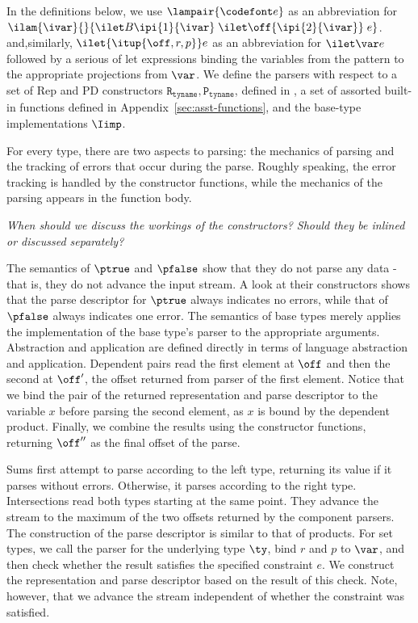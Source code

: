 In the definitions below, we use $\lampair{\codefont e}$ as an
abbreviation for $\ilam{\ivar}{}{
  \ilet B {\ipi{1}{\ivar}}\;
  \ilet \off {\ipi{2}{\ivar}}\; e}$.
and,similarly, $\ilet {\itup{\off,r,p}} e$ as an abbreviation for
$\ilet \var e$ followed by a serious of let expressions binding the
variables from the pattern to the appropriate projections from $\var$.
We define the parsers with respect to a set of Rep and PD constructors
$\mathtt{R_{tyname}, P_{tyname}}$, defined in ,
a set of assorted built-in functions defined in
Appendix~\ref{sec:asst-functions}, and the base-type implementations
$\Iimp$.

For every type, there are two aspects to parsing: the mechanics of
parsing and the tracking of errors that occur during the parse.
Roughly speaking, the error tracking is handled by the constructor
functions, while the mechanics of the parsing appears in the function
body.

{\em When should we discuss the workings of the constructors? Should
  they be inlined or discussed separately?}

The semantics of $\ptrue$ and $\pfalse$ show that they do not parse
any data - that is, they do not advance the input stream. A look at
their constructors shows that the parse descriptor for $\ptrue$ always
indicates no errors, while that of $\pfalse$ always indicates one
error. The semantics of base types merely applies the implementation
of the base type's parser to the appropriate arguments. Abstraction
and application are defined directly in terms of \implang language
abstraction and application.  Dependent pairs read the first element
at $\off$ and then the second at $\off'$, the offset returned from
parser of the first element.  Notice that we bind the pair of the
returned representation and parse descriptor to the variable $x$
before parsing the second element, as $x$ is bound by the dependent
product. Finally, we combine the results using the constructor
functions, returning $\off''$ as the final offset of the parse.

Sums first attempt to parse according to the left type, returning its
value if it parses without errors. Otherwise, it parses according to
the right type. Intersections read both types starting at the same
point. They advance the stream to the maximum of the two offsets
returned by the component parsers. The construction of the parse
descriptor is similar to that of products. For set types, we call the
parser for the underlying type $\ty$, bind $r$ and $p$ to $\var$, and
then check whether the result satisfies the specified constraint $e$.
We construct the representation and parse descriptor based on the
result of this check. Note, however, that we advance the stream
independent of whether the constraint was satisfied.

